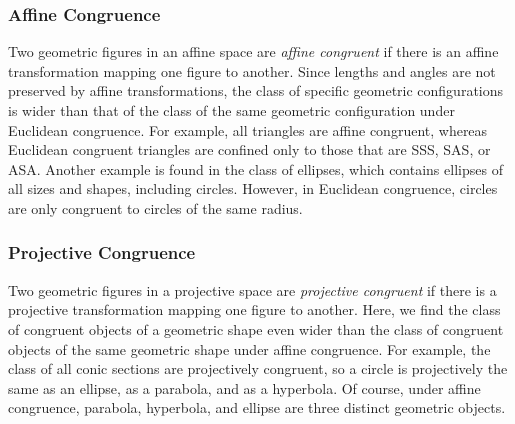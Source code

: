 \documentclass{article}
\begin{document}
\subsubsection*{Affine Congruence}

Two geometric figures in an affine space are \emph{affine congruent} if there is an affine transformation mapping one figure to another.
Since lengths and angles are not preserved by affine transformations, the class of specific geometric configurations is wider
than that of the class of the same geometric configuration under Euclidean congruence.  For example, all triangles are
affine congruent, whereas Euclidean congruent triangles are confined only to those that are SSS, SAS, or ASA.  Another
example is found in the class of ellipses, which contains ellipses of all sizes and shapes, including circles.  However, in
Euclidean congruence, circles are only congruent to circles of the same radius.

\subsubsection*{Projective Congruence}

Two geometric figures in a projective space are \emph{projective congruent} if there is a projective transformation mapping one
figure to another.  Here, we find the class of congruent objects of a geometric shape even wider than the class of
congruent objects of the same geometric shape under affine congruence.  For example, the class of all conic sections are
projectively congruent, so a circle is projectively the same as an ellipse, as a parabola, and as a hyperbola.  Of course,
under affine congruence, parabola, hyperbola, and ellipse are three distinct geometric objects.
\end{document}
